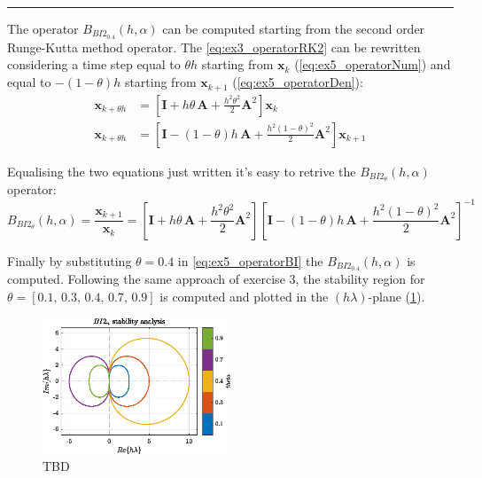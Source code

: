 \documentclass[11pt,a4paper,oneside]{article}
\renewcommand{\vec}[1]{\mathbf{#1}}
\begin{document}
\medskip \hrule \medskip

The operator $B_{BI2_{0.4}}(h,\alpha)$ can be computed starting from the second order Runge-Kutta method operator.
The \cref{eq:ex3_operatorRK2} can be rewritten considering a time step equal to $\theta h$ starting from $\vec{x}_k$ (\cref{eq:ex5_operatorNum}) and equal to $-(1-\theta)h$ starting from $\vec{x}_{k+1}$ (\cref{eq:ex5_operatorDen}):
\begin{subequations}
    \begin{align}
        \vec{x}_{k+\theta h} &= \left[ \vec{I} + h \theta\,    \vec{A} + \frac{h^2 \theta^2}{2} \vec{A}^2 \right] \vec{x}_k         \label{eq:ex5_operatorNum}\\
        \vec{x}_{k+\theta h} &= \left[ \vec{I} - (1-\theta)h\, \vec{A} + \frac{h^2 (1-\theta)^2}{2} \vec{A}^2 \right] \vec{x}_{k+1} \label{eq:ex5_operatorDen}
    \end{align}
\end{subequations}

Equalising the two equations just written it's easy to retrive the $B_{BI2_{\theta}}(h,\alpha)$ operator:
\begin{equation}
    B_{BI2_{\theta}}(h,\alpha) = \frac{\vec{x}_{k+1}}{\vec{x}_k}
                               = \left[ \vec{I} + h \theta\, \vec{A} + \frac{h^2 \theta^2}{2} \vec{A}^2 \right] \left[ \vec{I} - (1-\theta)h\, \vec{A} + \frac{h^2 (1-\theta)^2}{2} \vec{A}^2 \right] ^{-1}
    \label{eq:ex5_operatorBI}
\end{equation}

Finally by substituting $\theta = 0.4$ in \cref{eq:ex5_operatorBI} the $B_{BI2_{0.4}}(h,\alpha)$ is computed.
Following the same approach of exercise 3, the stability region for $\theta = [0.1,\, 0.3,\, 0.4,\, 0.7,\, 0.9]$ is computed and plotted in the $(h\lambda)$-plane (\cref{fig:ex5_stabReg}).
\begin{figure}[htb]
    \centering
    \includegraphics*[width=0.5\textwidth, keepaspectratio]{ex5_stabReg.eps}
    \caption[]{\label{fig:ex5_stabReg} TBD}
\end{figure}
\end{document}
